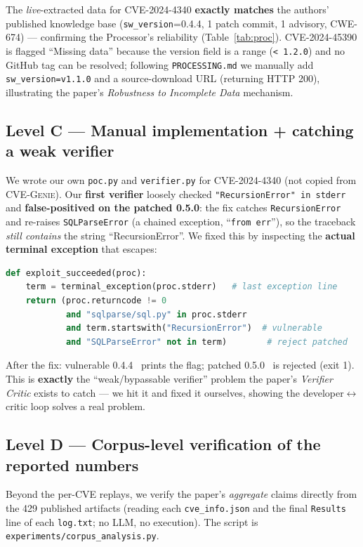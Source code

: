 \documentclass[conference,10pt,a4paper]{IEEEtran}
\newcommand{\yes}{\textcolor{ok}{\checkmark}}
\newcommand{\no}{\textcolor{bad}{\texttimes}}
\newcommand{\code}[1]{\texttt{\small #1}}
\begin{document}
The \textit{live}-extracted data for CVE-2024-4340 \textbf{exactly matches} the authors' published knowledge base (\code{sw\_version}=0.4.4, 1 patch commit, 1 advisory, CWE-674) --- confirming the Processor's reliability (Table~\ref{tab:proc}). CVE-2024-45390 is flagged ``Missing data'' because the version field is a range (\code{< 1.2.0}) and no GitHub tag can be resolved; following \code{PROCESSING.md} we manually add \code{sw\_version=v1.1.0} and a source-download URL (returning HTTP 200), illustrating the paper's \textit{Robustness to Incomplete Data} mechanism.

\subsection{Level C --- Manual implementation + catching a weak verifier}
We wrote our own \code{poc.py} and \code{verifier.py} for CVE-2024-4340 (not copied from CVE-G\textsc{enie}). Our \textbf{first verifier} loosely checked \code{"RecursionError" in stderr} and \textbf{false-positived on the patched 0.5.0}: the fix catches \code{RecursionError} and re-raises \code{SQLParseError} (a chained exception, ``\code{from err}''), so the traceback \textit{still contains} the string ``RecursionError''. We fixed this by inspecting the \textbf{actual terminal exception} that escapes:

\begin{lstlisting}[language=Python]
def exploit_succeeded(proc):
    term = terminal_exception(proc.stderr)   # last exception line
    return (proc.returncode != 0
            and "sqlparse/sql.py" in proc.stderr
            and term.startswith("RecursionError")  # vulnerable
            and "SQLParseError" not in term)        # reject patched
\end{lstlisting}

After the fix: vulnerable 0.4.4 \yes\ prints the flag; patched 0.5.0 \no\ is rejected (exit 1). This is \textbf{exactly} the ``weak/bypassable verifier'' problem the paper's \textit{Verifier Critic} exists to catch --- we hit it and fixed it ourselves, showing the developer$\leftrightarrow$critic loop solves a real problem.

\subsection{Level D --- Corpus-level verification of the reported numbers}
Beyond the per-CVE replays, we verify the paper's \textit{aggregate} claims directly from the 429 published artifacts (reading each \code{cve\_info.json} and the final \code{Results} line of each \code{log.txt}; no LLM, no execution). The script is \code{experiments/corpus\_analysis.py}.
\end{document}
